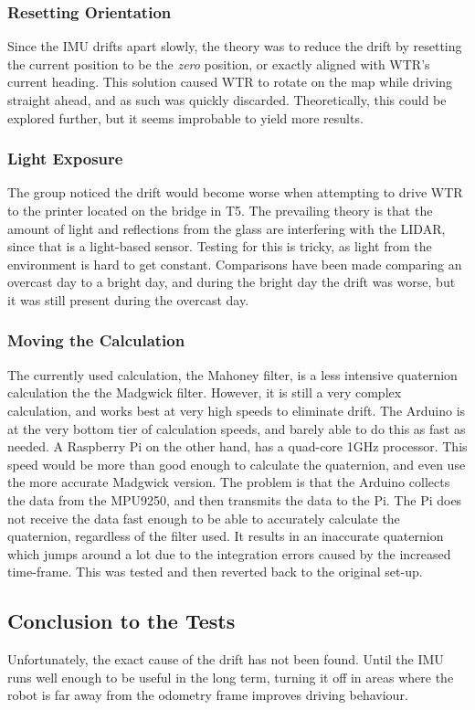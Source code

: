 \subsubsection{Resetting Orientation}
\label{subs::reset}
Since the IMU drifts apart slowly, the theory was to reduce the drift by resetting the current position to be the \textit{zero} position, or exactly aligned with WTR's current heading.
This solution caused WTR to rotate on the map while driving straight ahead, and as such was quickly discarded.
Theoretically, this could be explored further, but it seems improbable to yield more results.

\subsubsection{Light Exposure}
\label{subs::light}
The group noticed the drift would become worse when attempting to drive WTR to the printer located on the bridge in T5.
The prevailing theory is that the amount of light and reflections from the glass are interfering with the LIDAR, since that is a light-based sensor.
Testing for this is tricky, as light from the environment is hard to get constant.
Comparisons have been made comparing an overcast day to a bright day, and during the bright day the drift was worse, but it was still present during the overcast day.

\subsubsection{Moving the Calculation}
\label{subs::pi}
The currently used calculation, the Mahoney filter, is a less intensive quaternion calculation the the Madgwick filter.
However, it is still a very complex calculation, and works best at very high speeds to eliminate drift.
The Arduino is at the very bottom tier of calculation speeds, and barely able to do this as fast as needed.
A Raspberry Pi on the other hand, has a quad-core 1GHz processor.
This speed would be more than good enough to calculate the quaternion, and even use the more accurate Madgwick version.
The problem is that the Arduino collects the data from the MPU9250, and then transmits the data to the Pi.
The Pi does not receive the data fast enough to be able to accurately calculate the quaternion, regardless of the filter used.
It results in an inaccurate quaternion which jumps around a lot due to the integration errors caused by the increased time-frame.
This was tested and then reverted back to the original set-up.

\subsection{Conclusion to the Tests}
Unfortunately, the exact cause of the drift has not been found.
Until the IMU runs well enough to be useful in the long term, turning it off in areas where the robot is far away from the odometry frame improves driving behaviour.

\newpage
